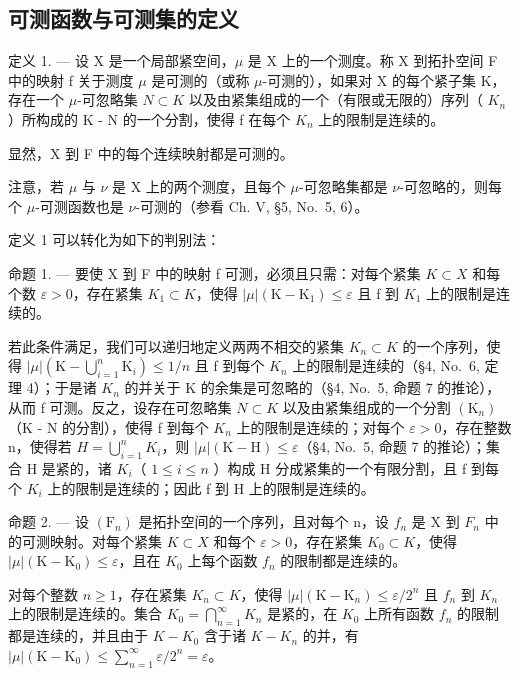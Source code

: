 \subsection{可测函数与可测集的定义}

定义 1. --- 设 X 是一个局部紧空间，\(\mu\) 是 X 上的一个测度。称 X 到拓扑空间 F 中的映射 f 关于测度 \(\mu\) 是可测的（或称 \(\mu\)-可测的），如果对 X 的每个紧子集 K，存在一个 \(\mu\)-可忽略集 \(N \subset K\) 以及由紧集组成的一个（有限或无限的）序列（ \(K_{n}\) ）所构成的 K - N 的一个分割，使得 f 在每个 \(K_{n}\) 上的限制是连续的。

显然，X 到 F 中的每个连续映射都是可测的。

注意，若 \(\mu\) 与 \(\nu\) 是 X 上的两个测度，且每个 \(\mu\)-可忽略集都是 \(\nu\)-可忽略的，则每个 \(\mu\)-可测函数也是 \(\nu\)-可测的（参看 Ch. V, §5, No.~5, 6）。

定义 1 可以转化为如下的判别法：

命题 1. --- 要使 X 到 F 中的映射 f 可测，必须且只需：对每个紧集 \(K \subset X\) 和每个数 \(\varepsilon > 0\)，存在紧集 \(K_{1} \subset K\)，使得 \(|\mu|(\mathrm{K} - \mathrm{K}_{1}) \leqslant \varepsilon\) 且 f 到 \(K_{1}\) 上的限制是连续的。

若此条件满足，我们可以递归地定义两两不相交的紧集 \(K_{n} \subset K\) 的一个序列，使得 \(|\mu|(\mathrm{K} - \bigcup_{i=1}^{n} \mathrm{K}_{i}) \leqslant 1/n\) 且 f 到每个 \(K_{n}\) 上的限制是连续的（§4, No.~6, 定理 4）；于是诸 \(K_{n}\) 的并关于 K 的余集是可忽略的（§4, No.~5, 命题 7 的推论），从而 f 可测。反之，设存在可忽略集 \(N \subset K\) 以及由紧集组成的一个分割 \((\mathrm{K}_{n})\)（K - N 的分割），使得 f 到每个 \(K_{n}\) 上的限制是连续的；对每个 \(\varepsilon > 0\)，存在整数 n，使得若 \(H = \bigcup_{i=1}^{n} K_{i}\)，则 \(|\mu|(\mathrm{K} - \mathrm{H}) \leqslant \varepsilon\)（§4, No.~5, 命题 7 的推论）；集合 H 是紧的，诸 \(K_{i}\)（ \(1 \leqslant i \leqslant n\) ）构成 H 分成紧集的一个有限分割，且 f 到每个 \(K_{i}\) 上的限制是连续的；因此 f 到 H 上的限制是连续的。

命题 2. --- 设 \((\mathrm{F}_{n})\) 是拓扑空间的一个序列，且对每个 n，设 \(f_{n}\) 是 X 到 \(F_{n}\) 中的可测映射。对每个紧集 \(K \subset X\) 和每个 \(\varepsilon > 0\)，存在紧集 \(K_{0} \subset K\)，使得 \(|\mu|(\mathrm{K} - \mathrm{K}_{0}) \leqslant \varepsilon\)，且在 \(K_{0}\) 上每个函数 \(f_{n}\) 的限制都是连续的。

对每个整数 \(n \geqslant 1\)，存在紧集 \(K_{n} \subset K\)，使得 \(|\mu|(\mathrm{K} - \mathrm{K}_{n}) \leqslant \varepsilon/2^{n}\) 且 \(f_{n}\) 到 \(K_{n}\) 上的限制是连续的。集合 \(K_{0} = \bigcap_{n=1}^{\infty} K_{n}\) 是紧的，在 \(K_{0}\) 上所有函数 \(f_{n}\) 的限制都是连续的，并且由于 \(K - K_{0}\) 含于诸 \(K - K_{n}\) 的并，有 \(|\mu|(\mathrm{K} - \mathrm{K}_{0}) \leqslant \sum_{n=1}^{\infty} \varepsilon/2^{n} = \varepsilon\)。

